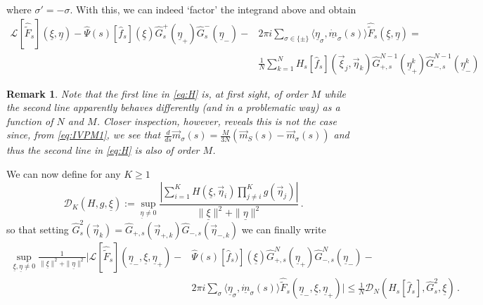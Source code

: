 \documentclass{article}
\newcommand\uxi{{\underline \xi}}
\newcommand\ueta{{\underline \eta}}
\newcommand\veta{{\vec \eta}}
\newtheorem{Remark}{Remark}
\begin{document}
%
where $\sigma' = -\sigma$.
With this, we can indeed `factor' the integrand above and obtain
%
\begin{equation*}
\begin{aligned}
\mathcal L [\widehat {\widetilde F}_s](\uxi,\ueta) - 
\widehat\Psi(s) [\hat{ f}_s](\uxi) \widehat G_s^+(\ueta_+)\widehat G_s^-(\ueta_-) - &2\pi 
i\sum_{\sigma\in\{\pm\}}\langle\ueta_\sigma, \dot{\underline m}_\sigma(s)\rangle\widehat {\widetilde
F}_s(\uxi,\ueta)=\\
&\frac 1 N  \sum_{k = 1}^N H_{s}[\hat{ f}_s](\vec \xi_j, \vec\eta_{k}) \widehat 
G_{+,s}^{N-1}(\ueta_+^k)\widehat G_{-,s}^{N-1}(\ueta_-^k)
\end{aligned}
\end{equation*}
%
\begin{Remark}\emph{
Note that the first line in \eqref{eq:H} is, at first sight, of order $M$ while the second line apparently behaves
differently (and in a problematic way) as a function of $N$ and $M$. Closer inspection, however, reveals this is not the
case since, from \eqref{eq:IVPM1}, we see that $\frac{d}{ds}\vec m_\sigma(s)=\frac{M}{3N}(\vec m_S(s) - \vec
m_\sigma(s))$ and thus the second line in \eqref{eq:H} is also of order $M$. }
\end{Remark}

We can now define for any 
$K \geq 1$
%
\begin{equation}\label{eq:DN}
\mathcal D_K(H, g,\uxi):=\sup_{\ueta\not=0}\frac{\left|\sum_{i=1}^K 
H(\uxi,\veta_{i})\prod_{j\not=i}^Kg(\veta_{j})\right|}{\|\uxi\|^2 + \|\ueta\|^2} \, .
\end{equation}
so that setting $\widehat G_{s}^2(\veta_k)= \widehat G_{+,s}(\veta_{+,k})\widehat G_{-,s}(\veta_{-,k})$ we can 
finally write
%
\[
\begin{aligned}
\sup_{\uxi, \ueta \ne 0} 
\frac1{\|\underline \xi\|^2 + \|\underline\eta\|^2}\biggl|\mathcal L [\widehat {\widetilde 
F}_s](\ueta_-,\uxi,\ueta_+) 
- &\widehat\Psi(s) [\hat{f}_s)](\uxi) \widehat G_{+,s}^N(\ueta_+)\widehat G_{-,s}^N(\ueta_-) - \\
&2\pi i\sum_\sigma\langle\ueta_\sigma, \dot {\underline m}_\sigma(s)\rangle\widehat {\widetilde 
F}_s(\ueta_-,\uxi,\ueta_+)\biggr| 
 \leq \frac 1N \mathcal D_N(H_{s}[\hat{f}_s],\widehat G_{s}^2,\uxi)\, .
\end{aligned}
\]
\end{document}
